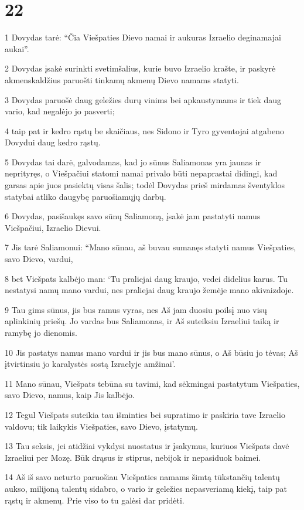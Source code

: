 \chapter{22}


\par 1 Dovydas tarė: “Čia Viešpaties Dievo namai ir aukuras Izraelio deginamajai aukai”. 
\par 2 Dovydas įsakė surinkti svetimšalius, kurie buvo Izraelio krašte, ir paskyrė akmenskaldžius paruošti tinkamų akmenų Dievo namams statyti. 
\par 3 Dovydas paruošė daug geležies durų vinims bei apkaustymams ir tiek daug vario, kad negalėjo jo pasverti; 
\par 4 taip pat ir kedro rąstų be skaičiaus, nes Sidono ir Tyro gyventojai atgabeno Dovydui daug kedro rąstų. 
\par 5 Dovydas tai darė, galvodamas, kad jo sūnus Saliamonas yra jaunas ir neprityręs, o Viešpačiui statomi namai privalo būti nepaprastai didingi, kad garsas apie juos pasiektų visas šalis; todėl Dovydas prieš mirdamas šventyklos statybai atliko daugybę paruošiamųjų darbų. 
\par 6 Dovydas, pasišaukęs savo sūnų Saliamoną, įsakė jam pastatyti namus Viešpačiui, Izraelio Dievui. 
\par 7 Jis tarė Saliamonui: “Mano sūnau, aš buvau sumanęs statyti namus Viešpaties, savo Dievo, vardui, 
\par 8 bet Viešpats kalbėjo man: ‘Tu praliejai daug kraujo, vedei didelius karus. Tu nestatysi namų mano vardui, nes praliejai daug kraujo žemėje mano akivaizdoje. 
\par 9 Tau gims sūnus, jis bus ramus vyras, nes Aš jam duosiu poilsį nuo visų aplinkinių priešų. Jo vardas bus Saliamonas, ir Aš suteiksiu Izraeliui taiką ir ramybę jo dienomis. 
\par 10 Jis pastatys namus mano vardui ir jis bus mano sūnus, o Aš būsiu jo tėvas; Aš įtvirtinsiu jo karalystės sostą Izraelyje amžinai’. 
\par 11 Mano sūnau, Viešpats tebūna su tavimi, kad sėkmingai pastatytum Viešpaties, savo Dievo, namus, kaip Jis kalbėjo. 
\par 12 Tegul Viešpats suteikia tau išminties bei supratimo ir paskiria tave Izraelio valdovu; tik laikykis Viešpaties, savo Dievo, įstatymų. 
\par 13 Tau seksis, jei atidžiai vykdysi nuostatus ir įsakymus, kuriuos Viešpats davė Izraeliui per Mozę. Būk drąsus ir stiprus, nebijok ir nepasiduok baimei. 
\par 14 Aš iš savo neturto paruošiau Viešpaties namams šimtą tūkstančių talentų aukso, milijoną talentų sidabro, o vario ir geležies nepasveriamą kiekį, taip pat rąstų ir akmenų. Prie viso to tu galėsi dar pridėti. 
